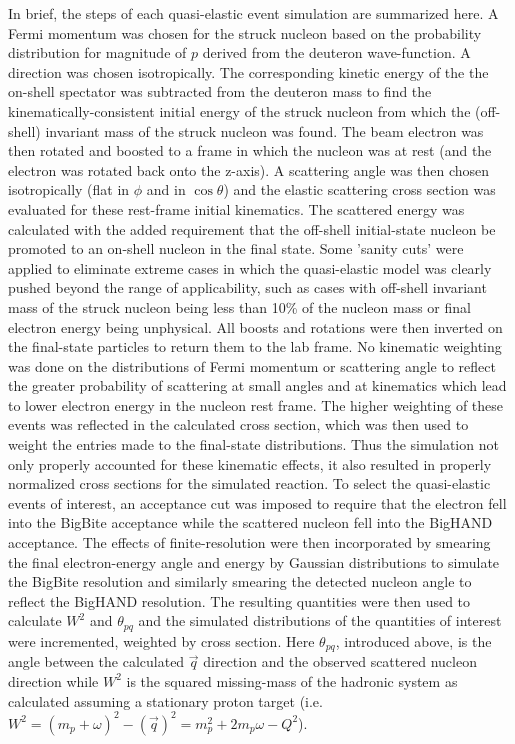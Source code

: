 \documentclass[12pt,letterpaper,oneside]{article}
\begin{document}
In brief, the steps of each quasi-elastic event simulation are summarized
here.  A Fermi momentum was chosen for the struck nucleon based on the
probability distribution for magnitude of $p$ derived from the
deuteron wave-function.  A direction was chosen isotropically.
  The corresponding kinetic energy of the the on-shell
spectator was subtracted from the deuteron mass to find the
kinematically-consistent initial energy of the struck nucleon from
which the (off-shell) invariant mass of the struck nucleon was found.
The beam electron was then rotated and boosted to a frame in which the
nucleon was at rest (and the electron was rotated back onto the
z-axis).  A scattering angle was then chosen isotropically (flat in
$\phi$ and in $\cos\theta$) and the elastic scattering cross section
was evaluated for these rest-frame initial kinematics.  The scattered
energy was calculated with the added requirement that the off-shell
initial-state nucleon be promoted to an on-shell nucleon in the final
state. Some 'sanity cuts'
were applied to eliminate extreme cases in which the quasi-elastic
model was clearly pushed beyond the range of applicability, such as
cases with off-shell invariant mass of the struck nucleon being less
than 10\% of the nucleon mass or final electron energy being unphysical.
All boosts and
rotations were then inverted on the final-state particles to return
them to the lab frame.  No kinematic weighting was done on the 
distributions of Fermi momentum or scattering angle to reflect the
greater probability of scattering at small angles and at kinematics
which lead to lower electron energy in the nucleon rest frame.  The
higher weighting of these events was reflected in the calculated cross
section, which was then used to weight the entries made to the
final-state distributions.  Thus the simulation not only properly
accounted for these kinematic effects, it also resulted in properly
normalized cross sections for the simulated reaction. To select the
quasi-elastic events of interest, an acceptance cut was imposed to
require that the electron fell into the BigBite acceptance while the
scattered nucleon fell into the BigHAND acceptance.  The effects of
finite-resolution were then incorporated by smearing the final
electron-energy angle and energy by Gaussian distributions to simulate
the BigBite resolution and similarly smearing the detected nucleon
angle to reflect the BigHAND resolution.  
 The resulting quantities were
then used to calculate $W^2$ and $\theta_{pq}$
and the  simulated distributions
of the quantities of interest were incremented, weighted by cross section.
Here $\theta_{pq}$, introduced above, is the 
angle between the calculated $\vec{q}$ 
direction and the observed scattered nucleon direction while $W^2$ is
the squared missing-mass of the hadronic system as calculated assuming
a stationary proton target (i.e. $W^2=(m_p+\omega)^2-(\vec{q})^2=
m_p^2+2m_p\omega-Q^2$).
\end{document}
